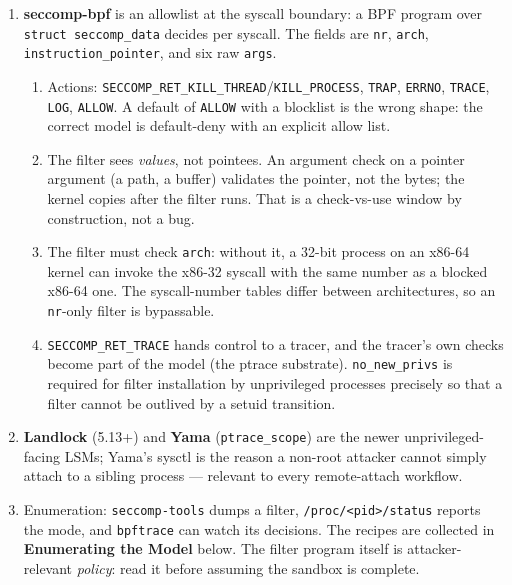 \documentclass[12pt]{Training}
\begin{document}
\begin{enumerate}
\begin{enumerate}
        \item \lstinline{CAP_SYS_ADMIN} retained in the container's user namespace, plus a filesystem or driver bug reachable from it;
        \item a leaked host file descriptor (an fd-lifetime bug, at model level);
        \item the shared kernel itself: namespaces do not change that all containers run one kernel, so the kernel attack surface is the container's surface too.
    \end{enumerate}
    \item \textbf{seccomp-bpf} is an allowlist at the syscall boundary: a BPF program over \lstinline{struct seccomp_data} decides per syscall. The fields are \lstinline{nr}, \lstinline{arch}, \lstinline{instruction_pointer}, and six raw \lstinline{args}.
    \begin{enumerate}
        \item Actions: \lstinline{SECCOMP_RET_KILL_THREAD}/\lstinline{KILL_PROCESS}, \lstinline{TRAP}, \lstinline{ERRNO}, \lstinline{TRACE}, \lstinline{LOG}, \lstinline{ALLOW}. A default of \lstinline{ALLOW} with a blocklist is the wrong shape: the correct model is default-deny with an explicit allow list.
        \item The filter sees \emph{values}, not pointees. An argument check on a pointer argument (a path, a buffer) validates the pointer, not the bytes; the kernel copies after the filter runs. That is a check-vs-use window by construction, not a bug.
        \item The filter must check \lstinline{arch}: without it, a 32-bit process on an x86-64 kernel can invoke the x86-32 syscall with the same number as a blocked x86-64 one. The syscall-number tables differ between architectures, so an \lstinline{nr}-only filter is bypassable.
        \item \lstinline{SECCOMP_RET_TRACE} hands control to a tracer, and the tracer's own checks become part of the model (the ptrace substrate). \lstinline{no_new_privs} is required for filter installation by unprivileged processes precisely so that a filter cannot be outlived by a setuid transition.
    \end{enumerate}
    \item \textbf{Landlock} (5.13+) and \textbf{Yama} (\lstinline{ptrace_scope}) are the newer unprivileged-facing LSMs; Yama's sysctl is the reason a non-root attacker cannot simply attach to a sibling process --- relevant to every remote-attach workflow.
    \item Enumeration: \lstinline{seccomp-tools} dumps a filter, \lstinline{/proc/<pid>/status} reports the mode, and \lstinline{bpftrace} can watch its decisions. The recipes are collected in \textbf{Enumerating the Model} below. The filter program itself is attacker-relevant \emph{policy}: read it before assuming the sandbox is complete.
\end{enumerate}
\end{document}
